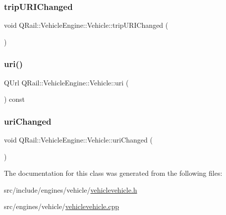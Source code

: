 \mbox{\label{classQRail_1_1VehicleEngine_1_1Vehicle_a9d8ff2ba6982a85ccd2c496be3f8e554}} 
\subsubsection{\texorpdfstring{tripURIChanged}{tripURIChanged}}
{\footnotesize\ttfamily void Q\+Rail\+::\+Vehicle\+Engine\+::\+Vehicle\+::trip\+U\+R\+I\+Changed (\begin{DoxyParamCaption}{ }\end{DoxyParamCaption})\hspace{0.3cm}{\ttfamily [signal]}}

\mbox{\label{classQRail_1_1VehicleEngine_1_1Vehicle_a80c5d4f38c97919e573439b94067d099}} 
\subsubsection{\texorpdfstring{uri()}{uri()}}
{\footnotesize\ttfamily Q\+Url Q\+Rail\+::\+Vehicle\+Engine\+::\+Vehicle\+::uri (\begin{DoxyParamCaption}{ }\end{DoxyParamCaption}) const}

\mbox{\label{classQRail_1_1VehicleEngine_1_1Vehicle_ac1b3292e6977df0f9a0e4d89b4d4c58c}} 
\subsubsection{\texorpdfstring{uriChanged}{uriChanged}}
{\footnotesize\ttfamily void Q\+Rail\+::\+Vehicle\+Engine\+::\+Vehicle\+::uri\+Changed (\begin{DoxyParamCaption}{ }\end{DoxyParamCaption})\hspace{0.3cm}{\ttfamily [signal]}}



The documentation for this class was generated from the following files\+:\begin{DoxyCompactItemize}
\item 
src/include/engines/vehicle/\mbox{\hyperlink{vehiclevehicle_8h}{vehiclevehicle.\+h}}\item 
src/engines/vehicle/\mbox{\hyperlink{vehiclevehicle_8cpp}{vehiclevehicle.\+cpp}}\end{DoxyCompactItemize}
